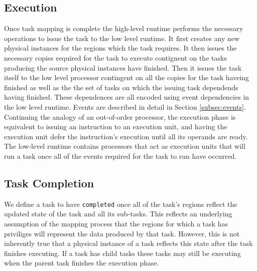 \subsection{Execution}
\label{subsec:execution}
Once task mapping is complete the high-level runtime performs the necessary operations
to issue the task to the low level runtime.  It first creates any new physical instances
for the regions which the task requires.  It then issues the necessary copies required
for the task to execute contignent on the tasks producing the source physical instances
have finished.  Then it issues the task itself to the low level processor contingent
on all the copies for the task haveing finished as well as the the set of tasks
on which the issuing task dependends having finished.  These dependences are all encoded
using event dependencies in the low level runtime.  Events are described
in detail in Section \ref{subsec:events}.  Continuing the analogy of an out-of-order
processor, the execution phase is equivalent to issuing an instruction to an
execution unit, and having the execution unit defer the instruction's execution until all its
operands are ready.  The low-level runtime contains processors that act as execution
units that will run a task once all of the events required for the task to run
have occurred. 



\subsection{Task Completion}
\label{subsec:cleanup}
We define a task to have {\tt completed} once all of the task's regions reflect
the updated state of the task and all its sub-tasks.  This reflects an underlying assumption 
of the mapping process that the regions for which a task has priviliges will represent the data produced 
by that task.  However, this is not inherently true that a physical instance of a task reflects
this state after the task finishes executing.  If a task has child tasks these tasks may
still be executing when the parent task finishes the execution phase.  

